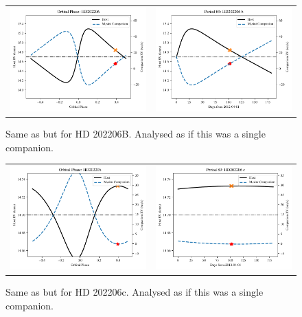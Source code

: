 \begin{figure}
    \centering
    \begin{tabular}{cc}
        \includegraphics[width=0.45\linewidth]{figures/direct-recovery/orbital-plots/HD202206B_orbital_phase.pdf}&
        \includegraphics[width=0.45\linewidth]{figures/direct-recovery/orbital-plots/HD202206B_p89.pdf}\\
    \end{tabular}
    \caption{Same as  but for HD 202206B. Analysed as if this was a single companion.}
    \label{fig:hd202206bp89}
\end{figure}

\begin{figure}
    \centering
    \begin{tabular}{cc}
        \includegraphics[width=0.45\linewidth]{figures/direct-recovery/orbital-plots/HD202206c_orbital_phase.pdf}&
        \includegraphics[width=0.45\linewidth]{figures/direct-recovery/orbital-plots/HD202206c_p89.pdf}\\
    \end{tabular}
    \caption{Same as  but for HD 202206c. Analysed as if this was a single companion. }
    \label{fig:hd202206cp89}
\end{figure}

